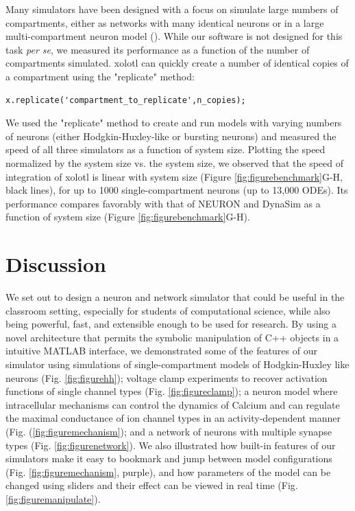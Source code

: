 \documentclass{frontiersSCNS} %
\begin{document}
Many simulators have been designed with a focus on simulate large numbers of compartments, either as networks with many identical neurons or in a large multi-compartment neuron model (\cite{bretteSimulationNetworksSpiking2007, sherfeyDynaSimMATLABToolbox2018, vitayANNarchyCodeGeneration2015, delormeSpikeNETEventdrivenSimulation2003}). While our software is not designed for this task {\em per se}, we measured its performance as a function of the number of compartments simulated. xolotl can quickly create a number of identical copies of a compartment using the "replicate" method: 

\begin{lstlisting}[style=Matlab-editor]
x.replicate('compartment_to_replicate',n_copies); 
\end{lstlisting}

We used the "replicate" method to create and run models with varying numbers of neurons (either Hodgkin-Huxley-like or bursting neurons) and measured the speed of all three simulators as a function of system size. Plotting the speed normalized by the system size vs. the system size, we observed that the speed of integration of xolotl is linear with system size (Figure \ref{fig:figurebenchmark}G-H, black lines), for up to 1000 single-compartment neurons (up to 13,000 ODEs). Its performance compares favorably with that of NEURON and DynaSim as a function of system size (Figure \ref{fig:figurebenchmark}G-H).


%
%
%
%
%
%

\section{Discussion}
\label{discussion}

We set out to design a neuron and network simulator that could be useful in the classroom setting, especially for students of computational science, while also being powerful, fast, and extensible enough to be used for research. By using a novel architecture that permits the symbolic manipulation of C++ objects in a intuitive MATLAB interface, we demonstrated some of the features of our simulator using simulations of single-compartment models of Hodgkin-Huxley like neurons (Fig. \ref{fig:figurehh}); voltage clamp experiments to recover activation functions of single channel types (Fig. \ref{fig:figureclamp}); a neuron model where intracellular mechanisms can control the dynamics of Calcium and can regulate the maximal conductance of ion channel types in an activity-dependent manner (Fig. (\ref{fig:figuremechanism}); and a network of neurons with multiple synapse types (Fig. \ref{fig:figurenetwork}). We also illustrated how built-in features of our simulators make it easy to bookmark and jump between model configurations (Fig. \ref{fig:figuremechanism}, purple), and how parameters of the model can be changed using sliders and their effect can be viewed in real time (Fig. \ref{fig:figuremanipulate}). 
\end{document}
